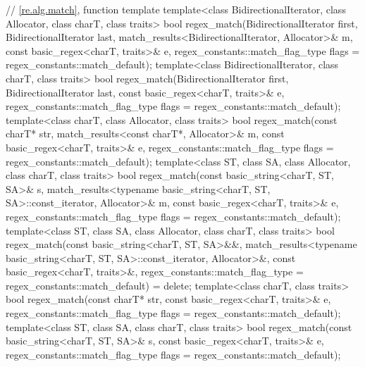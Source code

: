 \begin{codeblock}
{  // \ref{re.alg.match}, function template 
  template<class BidirectionalIterator, class Allocator, class charT, class traits>
    bool regex_match(BidirectionalIterator first, BidirectionalIterator last,
                     match_results<BidirectionalIterator, Allocator>& m,
                     const basic_regex<charT, traits>& e,
                     regex_constants::match_flag_type flags = regex_constants::match_default);
  template<class BidirectionalIterator, class charT, class traits>
    bool regex_match(BidirectionalIterator first, BidirectionalIterator last,
                     const basic_regex<charT, traits>& e,
                     regex_constants::match_flag_type flags = regex_constants::match_default);
  template<class charT, class Allocator, class traits>
    bool regex_match(const charT* str, match_results<const charT*, Allocator>& m,
                     const basic_regex<charT, traits>& e,
                     regex_constants::match_flag_type flags = regex_constants::match_default);
  template<class ST, class SA, class Allocator, class charT, class traits>
    bool regex_match(const basic_string<charT, ST, SA>& s,
                     match_results<typename basic_string<charT, ST, SA>::const_iterator,
                                   Allocator>& m,
                     const basic_regex<charT, traits>& e,
                     regex_constants::match_flag_type flags = regex_constants::match_default);
  template<class ST, class SA, class Allocator, class charT, class traits>
    bool regex_match(const basic_string<charT, ST, SA>&&,
                     match_results<typename basic_string<charT, ST, SA>::const_iterator,
                                   Allocator>&,
                     const basic_regex<charT, traits>&,
                     regex_constants::match_flag_type = regex_constants::match_default) = delete;
  template<class charT, class traits>
    bool regex_match(const charT* str,
                     const basic_regex<charT, traits>& e,
                     regex_constants::match_flag_type flags = regex_constants::match_default);
  template<class ST, class SA, class charT, class traits>
    bool regex_match(const basic_string<charT, ST, SA>& s,
                     const basic_regex<charT, traits>& e,
                     regex_constants::match_flag_type flags = regex_constants::match_default);

}
\end{codeblock}
